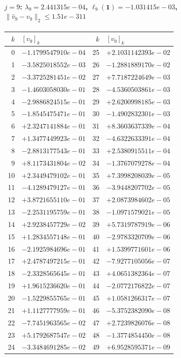 \paragraph{$j = 9$: $\lambda_{9} = 2.441315e-04$, \quad $\ell_{9}(\mathbf{1}) = -1.031415e-03$, \quad $\|\hat{v}_{9} - v_{9}\|_2 \leq 1.51e-311$}
\begin{center}
{\footnotesize
\begin{tabular}{r@{\;\;}l@{\quad}r@{\;\;}l}
\toprule
$k$ & $[v_{9}]_k$ & $k$ & $[v_{9}]_k$ \\
\midrule
0 & $-1.1799547910e-04$ & 25 & $+2.1031142393e-02$ \\
1 & $-3.5825018552e-03$ & 26 & $-1.2881889170e-02$ \\
2 & $-3.3725281451e-02$ & 27 & $+7.7187224649e-03$ \\
3 & $-1.4603058030e-01$ & 28 & $-4.5360503861e-03$ \\
4 & $-2.9886824515e-01$ & 29 & $+2.6200998185e-03$ \\
5 & $-1.8545475471e-01$ & 30 & $-1.4902832301e-03$ \\
6 & $+2.3247141884e-01$ & 31 & $+8.3603637339e-04$ \\
7 & $+1.3477449923e-01$ & 32 & $-4.6322633391e-04$ \\
8 & $-2.8813177543e-01$ & 33 & $+2.5380915511e-04$ \\
9 & $+8.1173431804e-02$ & 34 & $-1.3767079278e-04$ \\
10 & $+2.3449479102e-01$ & 35 & $+7.3998208039e-05$ \\
11 & $-4.1289479127e-01$ & 36 & $-3.9448207702e-05$ \\
12 & $+3.8721655110e-01$ & 37 & $+2.0873984602e-05$ \\
13 & $-2.2531195759e-01$ & 38 & $-1.0971579021e-05$ \\
14 & $+2.9238457729e-02$ & 39 & $+5.7319787919e-06$ \\
15 & $+1.2834557148e-01$ & 40 & $-2.9783320709e-06$ \\
16 & $-2.1925984696e-01$ & 41 & $+1.5399771601e-06$ \\
17 & $+2.4787497215e-01$ & 42 & $-7.9277105056e-07$ \\
18 & $-2.3328565645e-01$ & 43 & $+4.0651382364e-07$ \\
19 & $+1.9615236620e-01$ & 44 & $-2.0772176822e-07$ \\
20 & $-1.5229855765e-01$ & 45 & $+1.0581266317e-07$ \\
21 & $+1.1127777959e-01$ & 46 & $-5.3752382090e-08$ \\
22 & $-7.7451963565e-02$ & 47 & $+2.7239826076e-08$ \\
23 & $+5.1792687547e-02$ & 48 & $-1.3774854450e-08$ \\
24 & $-3.3484691285e-02$ & 49 & $+6.9528595371e-09$ \\
\bottomrule
\end{tabular}
}
\end{center}

